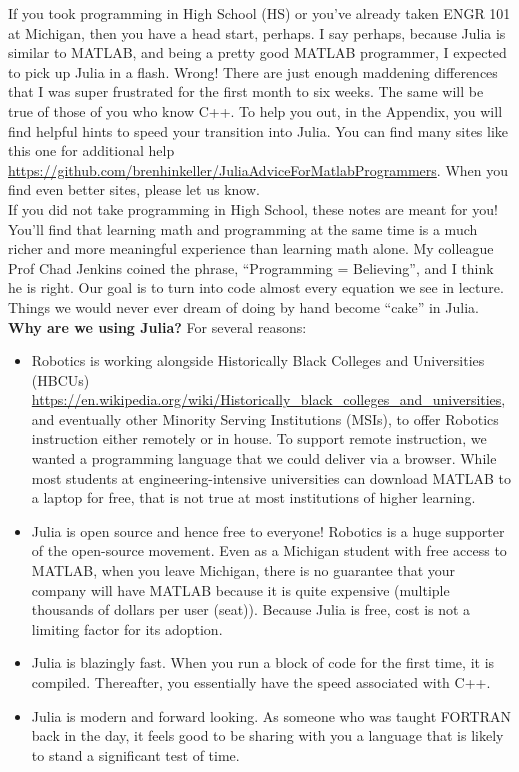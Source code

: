 If you took programming in High School (HS) or you've already taken ENGR 101 at Michigan, then you have a head start, perhaps. I say perhaps, because Julia is similar to MATLAB, and being a pretty good MATLAB programmer, I expected to pick up Julia in a flash. Wrong! There are just enough maddening differences that I was super frustrated for the first month to six weeks. The same will be true of those of you who know C++. To help you out, in the Appendix, you will find helpful hints to speed your transition into Julia. You can find many sites like this one for additional help \url{https://github.com/brenhinkeller/JuliaAdviceForMatlabProgrammers}. When you find even better sites, please let us know.\\

If you did not take programming in High School, these notes are meant for you! You'll find that learning math and programming at the same time is a much richer and more meaningful experience than learning math alone. My colleague Prof Chad Jenkins coined the phrase, ``Programming = Believing'', and I think he is right. Our goal is to turn into code almost every equation we see in lecture. Things we would never ever dream of doing by hand become ``cake'' in Julia. \\

\textbf{Why are we using Julia?} For several reasons:
\begin{itemize}
    \item Robotics is working alongside Historically Black Colleges and Universities (HBCUs) \url{https://en.wikipedia.org/wiki/Historically_black_colleges_and_universities}, and eventually other Minority Serving Institutions (MSIs), to offer Robotics instruction either remotely or in house. To support remote instruction, we wanted a programming language that we could deliver via a browser. While most students at engineering-intensive universities can download MATLAB to a laptop for free, that is not true at most institutions of higher learning. 
    \item Julia is open source and hence free to everyone! Robotics is a huge supporter of the open-source movement. Even as a Michigan student with free access to MATLAB, when you leave Michigan, there is no guarantee that your company will have MATLAB because it is quite expensive (multiple thousands of dollars per user (seat)). Because Julia is free, cost is not a limiting factor for its adoption. 
    \item Julia is blazingly fast. When you run a block of code for the first time, it is compiled. Thereafter, you essentially have the speed associated with C++.
    \item Julia is modern and forward looking. As someone who was taught FORTRAN back in the day, it feels good to be sharing with you a language that is likely to stand a significant test of time. 
\end{itemize}

